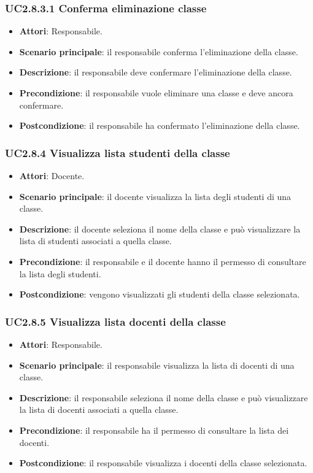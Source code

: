 \subsubsection{UC2.8.3.1 Conferma eliminazione classe}
\begin{itemize}
\item \textbf{Attori}: Responsabile.
\item \textbf{Scenario principale}: il responsabile conferma l'eliminazione della classe.
\item \textbf{Descrizione}: il responsabile deve confermare l'eliminazione della classe.
\item \textbf{Precondizione}: il responsabile vuole eliminare una classe e deve ancora confermare.
\item \textbf{Postcondizione}: il responsabile ha confermato l'eliminazione della classe.
\end{itemize}
\subsubsection{UC2.8.4 Visualizza lista studenti della classe}
\begin{itemize}
\item \textbf{Attori}: Docente.
\item \textbf{Scenario principale}: il docente visualizza la lista degli studenti di una classe.
\item \textbf{Descrizione}: il docente seleziona il nome della classe e può visualizzare la lista di studenti associati a quella classe.
\item \textbf{Precondizione}: il responsabile e il docente hanno il permesso di consultare la lista degli studenti.
\item \textbf{Postcondizione}: vengono visualizzati gli studenti della classe selezionata.
\end{itemize}
\subsubsection{UC2.8.5 Visualizza lista docenti della classe}
\begin{itemize}
\item \textbf{Attori}: Responsabile.
\item \textbf{Scenario principale}: il responsabile visualizza la lista di docenti di una classe.
\item \textbf{Descrizione}: il responsabile seleziona il nome della classe e può visualizzare la lista di docenti associati a quella classe.
\item \textbf{Precondizione}: il responsabile ha il permesso di consultare la lista dei docenti.
\item \textbf{Postcondizione}: il responsabile visualizza i docenti della classe selezionata.
\end{itemize}
